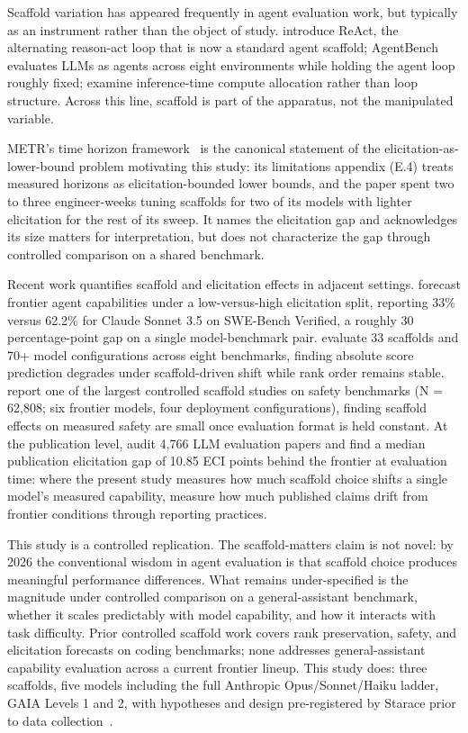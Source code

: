 \documentclass[10pt]{article} %
\begin{document}
    Scaffold variation has appeared frequently in agent evaluation work, but typically as an instrument rather than the object of study. \citet{yao2023react} introduce ReAct, the alternating reason-act loop that is now a standard agent scaffold; AgentBench~\citep{liu2025agentbench} evaluates LLMs as agents across eight environments while holding the agent loop roughly fixed; \citet{snell2024scaling} examine inference-time compute allocation rather than loop structure. Across this line, scaffold is part of the apparatus, not the manipulated variable.

    METR's time horizon framework~\citep{kwa2026measuring} is the canonical statement of the elicitation-as-lower-bound problem motivating this study: its limitations appendix (E.4) treats measured horizons as elicitation-bounded lower bounds, and the paper spent two to three engineer-weeks tuning scaffolds for two of its models with lighter elicitation for the rest of its sweep. It names the elicitation gap and acknowledges its size matters for interpretation, but does not characterize the gap through controlled comparison on a shared benchmark.

    Recent work quantifies scaffold and elicitation effects in adjacent settings. \citet{pimpale2025} forecast frontier agent capabilities under a low-versus-high elicitation split, reporting 33\% versus 62.2\% for Claude Sonnet 3.5 on SWE-Bench Verified, a roughly 30 percentage-point gap on a single model-benchmark pair. \citet{ndzomga2026} evaluate 33 scaffolds and 70+ model configurations across eight benchmarks, finding absolute score prediction degrades under scaffold-driven shift while rank order remains stable. \citet{gringras2026safety} report one of the largest controlled scaffold studies on safety benchmarks (N = 62{,}808; six frontier models, four deployment configurations), finding scaffold effects on measured safety are small once evaluation format is held constant. At the publication level, \citet{gringras2026} audit 4{,}766 LLM evaluation papers and find a median publication elicitation gap of 10.85 ECI points behind the frontier at evaluation time: where the present study measures how much scaffold choice shifts a single model's measured capability, \citet{gringras2026} measure how much published claims drift from frontier conditions through reporting practices.

    This study is a controlled replication. The scaffold-matters claim is not novel: by 2026 the conventional wisdom in agent evaluation is that scaffold choice produces meaningful performance differences. What remains under-specified is the magnitude under controlled comparison on a general-assistant benchmark, whether it scales predictably with model capability, and how it interacts with task difficulty. Prior controlled scaffold work covers rank preservation, safety, and elicitation forecasts on coding benchmarks; none addresses general-assistant capability evaluation across a current frontier lineup. This study does: three scaffolds, five models including the full Anthropic Opus/Sonnet/Haiku ladder, GAIA Levels 1 and 2, with hypotheses and design pre-registered by Starace prior to data collection~\citep{starace2026prereg}.
\end{document}
